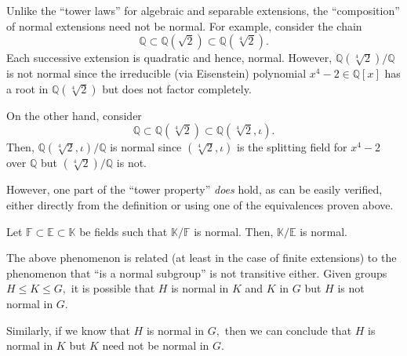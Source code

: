 \begin{rem}
    Unlike the ``tower laws'' for algebraic and separable extensions, the ``composition'' of normal extensions need not be normal. For example, consider the chain
    \begin{equation*} 
        \mathbb{Q} \subset \mathbb{Q}(\sqrt{2}) \subset \mathbb{Q}(\sqrt[4]{2}).
    \end{equation*}
    Each successive extension is quadratic and hence, normal. However, $\mathbb{Q}(\sqrt[4]{2})/\mathbb{Q}$ is not normal since the irreducible (via Eisenstein) polynomial $x^4 - 2 \in \mathbb{Q}[x]$ has a root in $\mathbb{Q}(\sqrt[4]{2})$ but does not factor completely.

    On the other hand, consider
    \begin{equation*} 
        \mathbb{Q} \subset \mathbb{Q}(\sqrt[4]{2}) \subset \mathbb{Q}(\sqrt[4]{2}, \iota).
    \end{equation*}
    Then, $\mathbb{Q}(\sqrt[4]{2}, \iota)/\mathbb{Q}$ is normal since $(\sqrt[4]{2}, \iota)$ is the splitting field for $x^4 - 2$ over $\mathbb{Q}$ but $(\sqrt[4]{2})/\mathbb{Q}$ is not.
\end{rem}

However, one part of the ``tower property'' \emph{does} hold, as can be easily verified, either directly from the definition or using one of the equivalences proven above.

\begin{prop} \label{prop:decompnormal}
    Let $\mathbb{F} \subset \mathbb{E} \subset \mathbb{K}$ be fields such that $\mathbb{K}/\mathbb{F}$ is normal. Then, $\mathbb{K}/\mathbb{E}$ is normal.
\end{prop}

\begin{rem}
    The above phenomenon is related (at least in the case of finite extensions) to the phenomenon that ``is a normal subgroup'' is not transitive either. Given groups $H \le K \le G,$ it is possible that $H$ is normal in $K$ and $K$ in $G$ but $H$ is not normal in $G.$ 

    Similarly, if we know that $H$ is normal in $G,$ then we can conclude that $H$ is normal in $K$ but $K$ need not be normal in $G.$
\end{rem}